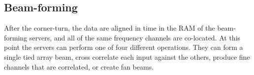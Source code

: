 \subsection{Beam-forming}

After the corner-turn, the data are aligned in time in the RAM of the beam-forming servers, and all of the same frequency channels are co-located. At this point the servers can perform one of four different operations. They can form a single tied array beam, cross correlate each input against the others, produce fine channels that are correlated, or create fan beams.